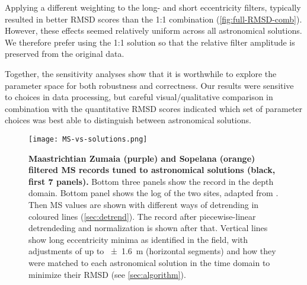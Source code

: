 \documentclass[draft]{agujournal2019}
\begin{document}
Applying a different weighting to the long- and short eccentricity filters, typically resulted in better \gls{RMSD} scores than the 1:1 combination (\cref{fig:full-RMSD-comb}).
However, these effects seemed relatively uniform across all astronomical solutions.
We therefore prefer using the 1:1 solution so that the relative filter amplitude is preserved from the original data.

Together, the sensitivity analyses show that it is worthwhile to explore the parameter space for both robustness and correctness.
Our results were sensitive to choices in data processing, but careful visual/qualitative comparison in combination with the quantitative \gls{RMSD} scores indicated which set of parameter choices was best able to distinguish between astronomical solutions.

\begin{figure}
  \centering
  \texttt{[image: MS-vs-solutions.png]}
  \caption{\label{fig:rolling-age-MS}
    \textbf{Maastrichtian Zumaia (purple) and Sopelana (orange) filtered \gls{MS} records tuned to astronomical solutions (black, first 7 panels).}
    Bottom three panels show the record in the depth domain.
    Bottom panel shows the log of the two sites, adapted from .
    Then \gls{MS} values are shown with different ways of detrending in coloured lines (\cref{sec:detrend}).
    The record after piecewise-linear detrendeding and normalization is shown after that.
    Vertical lines show long eccentricity minima as identified in the field,
    with adjustments of up to \qty{\pm1.6}{\metre} (horizontal segments)
    and how they were matched to each astronomical solution in the time domain to minimize their \gls{RMSD} (see \cref{sec:algorithm}).
    }
\end{figure}
\end{document}
